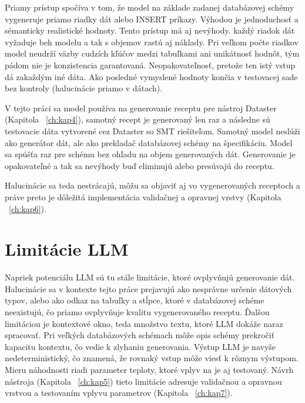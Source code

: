 Priamy prístup spočíva v tom, že model na základe zadanej databázovej schémy vygeneruje priamo riadky dát alebo INSERT príkazy. Výhodou je jednoduchosť a sémanticky realistické hodnoty. Tento prístup má aj nevýhody. každý riadok dát vyžaduje beh modelu a tak s objemov rastú aj náklady. Pri veľkom počte riadkov model neudrží väzby cudzích kľúčov medzi tabuľkami ani unikátnosť hodnôt, tým pádom nie je konzistencia garantovaná. Neopakovateľnosť, pretože ten istý vstup dá zakaždým iné dáta. Ako posledné vymyslené hodnoty končia v testovacej sade bez kontroly (halucinácie priamo v dátach). 


V tejto práci sa model používa na generovanie receptu pre nástroj Dataster (Kapitola ~\ref{ch:kap4}), samotný recept je generovaný len raz a následne sú testovacie dáta vytvorené cez Dataster so SMT riešiteľom. Samotný model neslúži ako generátor dát, ale ako prekladač databázovej schémy na špecifikáciu. Model sa spúšťa raz pre schému bez ohľadu na objem generovaných dát. Generovanie je opakovateľné a tak sa nevýhody buď eliminujú alebo presúvajú do receptu.

Halucinácie sa teda nestrácajú, môžu sa objaviť aj vo vygenerovaných receptoch a práve preto je dôležitá implementácia validačnej a opravnej vrstvy (Kapitola ~\ref{ch:kap6}).

\section{Limitácie LLM}

Napriek potenciálu LLM sú tu stále limitácie, ktoré ovplyvňujú generovanie dát. Halucinácie sa v kontexte tejto práce prejavujú ako nesprávne určenie dátových typov, alebo ako odkaz na tabuľky a stĺpce, ktoré v databázovej schéme neexistujú, čo priamo ovplyvňuje kvalitu vygenerovaného receptu. Ďalšou limitáciou je kontextové okno, teda množstvo textu, ktoré LLM dokáže naraz spracovať. Pri veľkých databázových schémach môže opis schémy prekročiť kapacitu kontextu, čo vedie k zlyhaniu generovania. Výstup LLM je navyše nedeterministický, čo znamená, že rovnaký vstup môže viesť k rôznym výstupom. Mieru náhodnosti riadi parameter teploty, ktoré vplyv na je aj testovaný. Návrh nástroja (Kapitola ~\ref{ch:kap5}) tieto limitácie adresuje validačnou a opravnou vrstvou a testovaním vplyvu parametrov (Kapitola ~\ref{ch:kap7}).  

